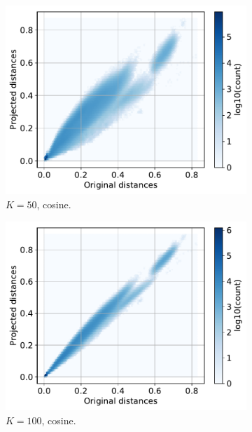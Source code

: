 \documentclass[11pt,onecolumn]{article}
\begin{document}
\begin{figure}[h!]
    \centering
    \begin{subfigure}[t]{0.29\textwidth}
        \centering
        \includegraphics[width=\linewidth]{fig/streamhash_projection_cosine_k50.pdf}
        \caption{$K=50$, cosine.}
    \end{subfigure}
    \hfill
		\begin{subfigure}[t]{0.29\textwidth}
				\centering
				\includegraphics[width=\linewidth]{fig/streamhash_projection_cosine_k100.pdf}
				\caption{$K=100$, cosine.}
		\end{subfigure}
		\hfill
		\begin{subfigure}[t]{0.29\textwidth}

\end{subfigure}
\end{figure}
\end{document}
